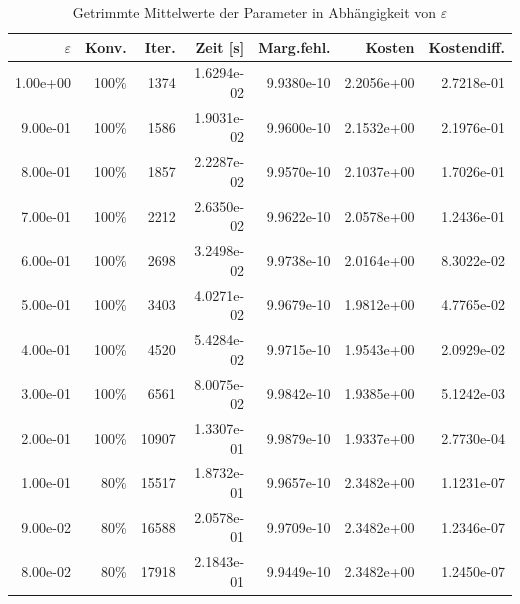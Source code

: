 \begin{table}[htbp]
\caption{Getrimmte Mittelwerte der Parameter in Abhängigkeit von $\varepsilon$}
\label{tab:Parametertest64_tol1e-09}
\small
\centering
{}
\begin{tabular}{rrrrrrr}
\toprule
$\varepsilon$ & Konv. & Iter. & Zeit [s] & Marg.fehl. & Kosten & Kostendiff. \\
\midrule
1.00e+00 & 100\% & 1374 & 1.6294e-02 & 9.9380e-10 & 2.2056e+00 & 2.7218e-01 \\
9.00e-01 & 100\% & 1586 & 1.9031e-02 & 9.9600e-10 & 2.1532e+00 & 2.1976e-01 \\
8.00e-01 & 100\% & 1857 & 2.2287e-02 & 9.9570e-10 & 2.1037e+00 & 1.7026e-01 \\
7.00e-01 & 100\% & 2212 & 2.6350e-02 & 9.9622e-10 & 2.0578e+00 & 1.2436e-01 \\
6.00e-01 & 100\% & 2698 & 3.2498e-02 & 9.9738e-10 & 2.0164e+00 & 8.3022e-02 \\
5.00e-01 & 100\% & 3403 & 4.0271e-02 & 9.9679e-10 & 1.9812e+00 & 4.7765e-02 \\
4.00e-01 & 100\% & 4520 & 5.4284e-02 & 9.9715e-10 & 1.9543e+00 & 2.0929e-02 \\
3.00e-01 & 100\% & 6561 & 8.0075e-02 & 9.9842e-10 & 1.9385e+00 & 5.1242e-03 \\
2.00e-01 & 100\% & 10907 & 1.3307e-01 & 9.9879e-10 & 1.9337e+00 & 2.7730e-04 \\
1.00e-01 & 80\% & 15517 & 1.8732e-01 & 9.9657e-10 & 2.3482e+00 & 1.1231e-07 \\
9.00e-02 & 80\% & 16588 & 2.0578e-01 & 9.9709e-10 & 2.3482e+00 & 1.2346e-07 \\
8.00e-02 & 80\% & 17918 & 2.1843e-01 & 9.9449e-10 & 2.3482e+00 & 1.2450e-07 \\
\bottomrule
\end{tabular}
\end{table}
